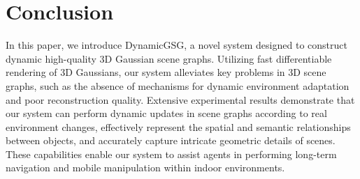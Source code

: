\section{Conclusion}
\label{sec:conclusion}
In this paper, we introduce DynamicGSG, a novel system designed to construct dynamic high-quality 3D Gaussian scene graphs. Utilizing fast differentiable rendering of 3D Gaussians, our system alleviates key problems in 3D scene graphs, such as the absence of mechanisms for dynamic environment adaptation and poor reconstruction quality. Extensive experimental results demonstrate that our system can perform dynamic updates in scene graphs according to real environment changes, effectively represent the spatial and semantic relationships between objects, and accurately capture intricate geometric details of scenes. These capabilities enable our system to assist agents in performing long-term navigation and mobile manipulation within indoor environments.

